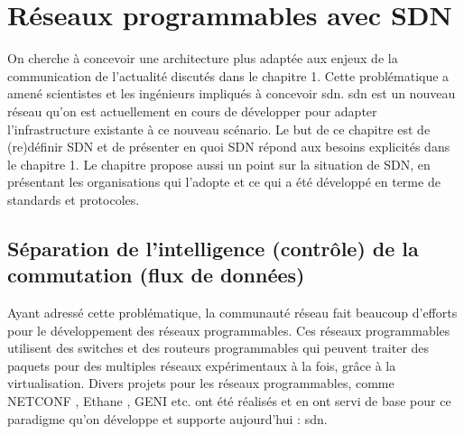 \chapter{Réseaux programmables avec SDN}

On cherche à concevoir une architecture plus adaptée aux enjeux de la communication de l'actualité discutés dans le chapitre 1. Cette problématique a amené scientistes et les ingénieurs impliqués à concevoir \gls{sdn}. \gls{sdn} est un nouveau  réseau qu'on est actuellement en cours de développer pour adapter l'infrastructure existante à ce nouveau scénario.
Le but de ce chapitre est de (re)définir SDN et de présenter en quoi SDN répond aux besoins explicités dans le chapitre 1.
Le chapitre propose aussi un point sur la situation de SDN, en présentant les organisations qui l'adopte et ce qui a été développé en terme de standards et protocoles.

\section{Séparation de l'intelligence (contrôle) de la commutation (flux de données)}

Ayant adressé cette problématique, la communauté réseau fait beaucoup d'efforts pour le développement des réseaux programmables. Ces réseaux programmables utilisent des switches et des routeurs programmables qui peuvent traiter des paquets pour des multiples réseaux expérimentaux  à la fois, grâce à la \gls{virtualisation}. \cite{OpenFlowStanfordOssification} Divers projets pour les réseaux programmables, comme NETCONF \cite{NETCONF}, Ethane \cite{Ethane}, GENI \cite{GENI} etc. ont été réalisés et en ont servi de base pour ce paradigme qu'on développe et supporte aujourd'hui : \gls{sdn}. 



